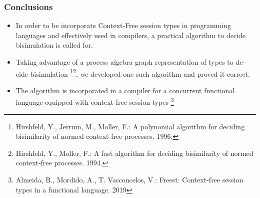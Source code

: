 \documentclass[10pt]{beamer}
\begin{document}

\begin{frame}
  \frametitle{Conclusions}

  \begin{itemize}
  \item In order to be incorporate Context-Free session types in programming
    languages and effectively used in compilers, a practical algorithm to decide
    bisimulation is called for.
  \item Taking advantage of a process algebra graph representation of types to
    de- cide bisimulation \footnote{Hirshfeld, Y., Jerrum, M., Moller, F.: A
      polynomial algorithm for deciding bisimilarity of normed context-free
      processes. 1996. }\footnote{Hirshfeld, Y., Moller, F.: A fast algorithm
      for deciding bisimilarity of normed context-free processes. 1994.}, we
    developed one such algorithm and proved it correct.
  \item The algorithm is incorporated in a compiler for a concurrent functional
    language equipped with context-free session types \footnote{Almeida, B.,
      Mordido, A., T. Vasconcelos, V.: Freest: Context-free session types in a
      functional language. 2019}
  \end{itemize}
 \end{frame}




 
\end{document}
